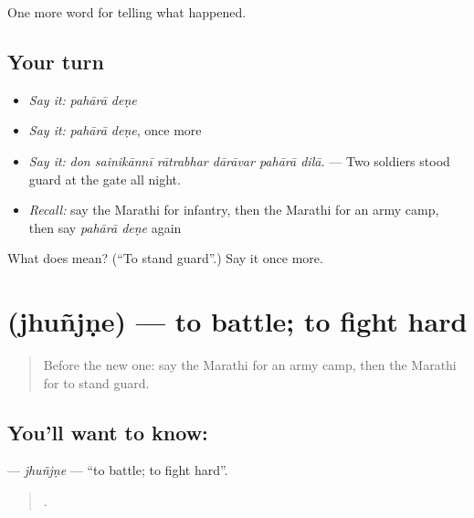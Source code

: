 \begin{grammarlens}[title={What you've built}]
One more word for telling what happened.
\end{grammarlens}

\subsection*{Your turn}
\begin{itemize}
\raggedright
  \item \emph{Say it:} \emph{pahārā deṇe}
  \item \emph{Say it:} \emph{pahārā deṇe}, once more
  \item \emph{Say it:} \emph{don sainikānnī rātrabhar dārāvar pahārā dilā.} — Two soldiers stood guard at the gate all night.
  \item \emph{Recall:} say the Marathi for infantry, then the Marathi for an army camp, then say \emph{pahārā deṇe} again
\end{itemize}

\begin{tcolorbox}[breakable,colback=teal!4,colframe=teal!35!black,title={Before you move on}]
What does   mean? (\textquotedblleft{}To stand guard\textquotedblright{}.) Say it once more.
\end{tcolorbox}
\section[\texorpdfstring{\mr{झुंजणे} (jhuñjṇe)}{झुंजणे (jhuñjṇe)}]{ (jhuñjṇe) — to battle; to fight hard}

\label{lesson:MR-C330-jhunjne}



\begin{quote}
Before the new one: say the Marathi for an army camp, then the Marathi for to stand guard.
\end{quote}

\subsection*{You'll want to know: }
\textbf{} — \emph{jhuñjṇe} — \textquotedblleft{}to battle; to fight hard\textquotedblright{}.

\begin{quote}
    .
\end{quote}

